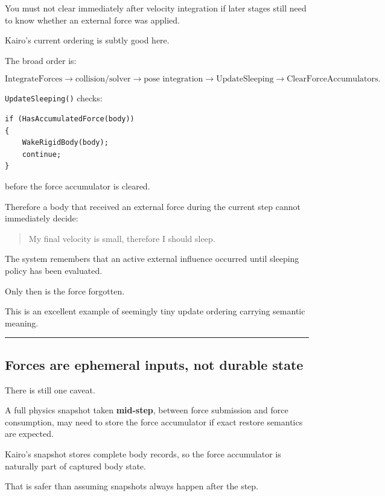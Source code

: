 You must not clear immediately after velocity integration if later stages still need to know whether an external force was applied.

Kairo's current ordering is subtly good here.

The broad order is:

\[
\text{IntegrateForces}
\rightarrow
\text{collision/solver}
\rightarrow
\text{pose integration}
\rightarrow
\text{UpdateSleeping}
\rightarrow
\text{ClearForceAccumulators}.
\]

\texttt{UpdateSleeping()} checks:

\begin{verbatim}
if (HasAccumulatedForce(body))
{
    WakeRigidBody(body);
    continue;
}
\end{verbatim}

before the force accumulator is cleared.

Therefore a body that received an external force during the current step cannot immediately decide:

\begin{quote}
My final velocity is small, therefore I should sleep.
\end{quote}

The system remembers that an active external influence occurred until sleeping policy has been evaluated.

Only then is the force forgotten.

This is an excellent example of seemingly tiny update ordering carrying semantic meaning.

\begin{center}\rule{0.5\linewidth}{0.5pt}\end{center}

\subsection{Forces are ephemeral inputs, not durable state}\label{06-engine-ii-ch038-forces-are-ephemeral-inputs-not-durable-state}

There is still one caveat.

A full physics snapshot taken \textbf{mid-step}, between force submission and force consumption, may need to store the force accumulator if exact restore semantics are expected.

Kairo's snapshot stores complete body records, so the force accumulator is naturally part of captured body state.

That is safer than assuming snapshots always happen after the step.

